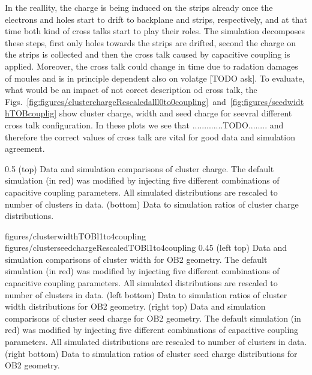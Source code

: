 In the reallity, the charge is being induced on the strips already once the electrons and holes start to drift to backplane and strips, respectively, and at that time both kind of cross talks start to play their roles. The simulation decomposes these steps, first only holes towards the strips are drifted, second the charge on the strips is collected and then the cross talk caused by capacitive coupling is applied. Moreover, the cross talk could change in time due to radation damages of moules and is in principle dependent also on volatge [TODO ask]. To evaluate, what would be an impact of not corect description od cross talk, the Figs.~\ref{fig:figures/clusterchargeRescaledalll0to0coupling}~and~\ref{fig:figures/seedwidthTOBcouplig} show cluster charge, width and seed charge for seevral different cross talk configuration. In these plots we see that .............TODO........  and therefore the correct values of cross talk are vital for good data and simulation agreement.


                 {0.5}       %
                 { (top) Data and simulation comparisons of cluster charge. The default simulation (in red) was modified by injecting five different combinations of capacitive coupling parameters. All simulated distributions are rescaled to number of clusters in data. (bottom) Data to simulation ratios of cluster charge distributions. }

                 {figures/clusterwidthTOBl1to4coupling}
                 {figures/clusterseedchargeRescaledTOBl1to4coupling} %
                 {0.45}       %
                 {(left top) Data and simulation comparisons of cluster width for OB2 geometry. The default simulation (in red) was modified by injecting five different combinations of capacitive coupling parameters. All simulated distributions are rescaled to number of clusters in data. (left bottom) Data to simulation ratios of cluster width distributions for OB2 geometry. (right top) Data and simulation  comparisons of cluster seed charge for OB2 geometry. The default simulation (in red) was modified by injecting five different combinations of capacitive coupling parameters. All simulated distributions are rescaled to number of clusters in data. (right bottom) Data to simulation ratios of cluster seed charge distributions for OB2 geometry. }

